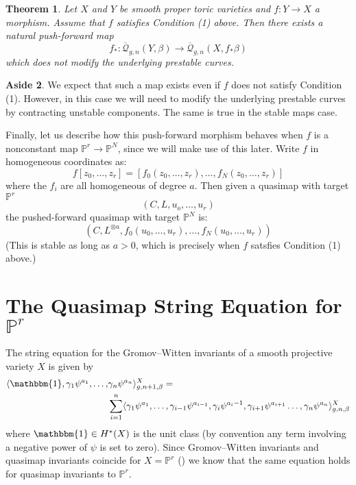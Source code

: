 \documentclass[11pt]{amsart}
\newcommand{\Q}[4]{\overline{\mathcal Q}_{#1,#2}(#3,#4)}
\newcommand{\PP}{\mathbb P}
\renewcommand{\to}{\rightarrow}
\theoremstyle{plain}
\newtheorem{thm}{Theorem}[section]
\theoremstyle{definition}
\newtheorem{aside}[thm]{Aside}
\begin{document}
\begin{thm} Let $X$ and $Y$ be smooth proper toric varieties and $f : Y \to X$ a morphism. Assume that $f$ satisfies Condition (1) above. Then there exists a natural push-forward map
\begin{equation*} f_* : \Q{g}{n}{Y}{\beta} \to \Q{g}{n}{X}{f_* \beta} \end{equation*}
which does not modify the underlying prestable curves.\end{thm}

\begin{aside} We expect that such a map exists even if $f$ does not satisfy Condition (1). However, in this case we will need to modify the underlying prestable curves by contracting unstable components. The same is true in the stable maps case. \end{aside}

Finally, let us describe how this push-forward morphism behaves when $f$ is a nonconstant map $\PP^r \to \PP^N$, since we will make use of this later. Write $f$ in homogeneous coordinates as:
\begin{equation*} f[z_0, \ldots, z_r] = [f_0(z_0, \ldots, z_r), \ldots, f_N(z_0, \ldots, z_r)] \end{equation*}
where the $f_i$ are all homogeneous of degree $a$. Then given a quasimap with target $\PP^r$
\begin{equation*} (C, L, u_o, \ldots, u_r) \end{equation*}
the pushed-forward quasimap with target $\PP^N$ is:
\begin{equation*} (C, L^{\otimes a}, f_0(u_0, \ldots, u_r) , \ldots, f_N(u_0, \ldots, u_r)) \end{equation*}
(This is stable as long as $a > 0$, which is precisely when $f$ satsfies Condition (1) above.)

\section{The Quasimap String Equation for $\PP^r$}

The string equation for the Gromov--Witten invariants of a smooth projective variety $X$ is given by
\begin{align*} \langle \mathbbm{1} , \gamma_1 \psi^{a_1} , \ldots, & \gamma_n \psi^{a_n} \rangle_{g,n+1,\beta}^X = \\
&  \sum_{i=1}^n \langle \gamma_1 \psi^{a_1}, \ldots, \gamma_{i-1} \psi^{a_{i-1}} , \gamma_i \psi^{a_i - 1} , \gamma_{i+1} \psi^{a_{i+1}} \ldots, \gamma_n \psi^{a_n} \rangle_{g,n,\beta}^X \end{align*}
where $\mathbbm{1} \in H^*(X)$ is the unit class (by convention any term involving a negative power of $\psi$ is set to zero). Since Gromov--Witten invariants and quasimap invariants coincide for $X=\PP^r$ (\cite[Section 5.4]{Manolache-Push}) we know that the same equation holds for quasimap invariants to $\PP^r$.
\end{document}
